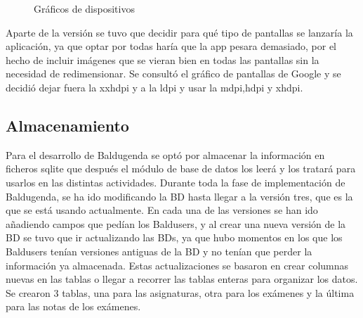 \begin{figure}
 \caption{Gráficos de dispositivos}
 \label{f:Gráficos de dispositivos}
\end{figure}

Aparte de la versión se tuvo que decidir para qué tipo de pantallas se lanzaría la aplicación, ya que optar por todas haría que la app pesara demasiado, por el hecho de incluir imágenes que se vieran bien en todas las pantallas sin la necesidad de redimensionar.
Se consultó el gráfico de pantallas de Google y se decidió dejar fuera la xxhdpi y a la ldpi y usar la mdpi,hdpi y xhdpi.


\subsection{Almacenamiento}
\label{subsecc:Almacenamiento}

Para el desarrollo de Baldugenda se optó por almacenar la información en ficheros sqlite que después el módulo de base de datos los leerá y los tratará para usarlos en las distintas actividades.
Durante toda la fase de implementación de Baldugenda, se ha ido modificando la BD hasta llegar a la versión tres, que es la que se está usando actualmente.
En cada una de las versiones se han ido añadiendo campos que pedían los Baldusers, y al crear una nueva versión de la BD se tuvo que ir actualizando las BDs, ya que hubo momentos en los que los Baldusers tenían versiones antiguas de la BD y no tenían que perder la información ya almacenada.
Estas actualizaciones se basaron en crear columnas nuevas en las tablas o llegar a recorrer las tablas enteras para organizar los datos.
Se crearon 3 tablas, una para las asignaturas, otra para los exámenes y la última para las notas de los exámenes.

